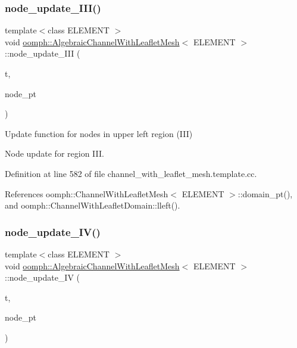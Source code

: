 \subsubsection{\texorpdfstring{node\+\_\+update\+\_\+\+I\+I\+I()}{node\_update\_III()}}
{\footnotesize\ttfamily template$<$class E\+L\+E\+M\+E\+NT $>$ \\
void \hyperlink{classoomph_1_1AlgebraicChannelWithLeafletMesh}{oomph\+::\+Algebraic\+Channel\+With\+Leaflet\+Mesh}$<$ E\+L\+E\+M\+E\+NT $>$\+::node\+\_\+update\+\_\+\+I\+II (\begin{DoxyParamCaption}\item[{const unsigned \&}]{t,  }\item[{Algebraic\+Node $\ast$\&}]{node\+\_\+pt }\end{DoxyParamCaption})\hspace{0.3cm}{\ttfamily [protected]}}



Update function for nodes in upper left region (I\+II) 

Node update for region I\+II. 

Definition at line 582 of file channel\+\_\+with\+\_\+leaflet\+\_\+mesh.\+template.\+cc.



References oomph\+::\+Channel\+With\+Leaflet\+Mesh$<$ E\+L\+E\+M\+E\+N\+T $>$\+::domain\+\_\+pt(), and oomph\+::\+Channel\+With\+Leaflet\+Domain\+::lleft().

\mbox{\label{classoomph_1_1AlgebraicChannelWithLeafletMesh_ac960faed226fa81f52ca605cffe3d1af}} 
\subsubsection{\texorpdfstring{node\+\_\+update\+\_\+\+I\+V()}{node\_update\_IV()}}
{\footnotesize\ttfamily template$<$class E\+L\+E\+M\+E\+NT $>$ \\
void \hyperlink{classoomph_1_1AlgebraicChannelWithLeafletMesh}{oomph\+::\+Algebraic\+Channel\+With\+Leaflet\+Mesh}$<$ E\+L\+E\+M\+E\+NT $>$\+::node\+\_\+update\+\_\+\+IV (\begin{DoxyParamCaption}\item[{const unsigned \&}]{t,  }\item[{Algebraic\+Node $\ast$\&}]{node\+\_\+pt }\end{DoxyParamCaption})\hspace{0.3cm}{\ttfamily [protected]}}




